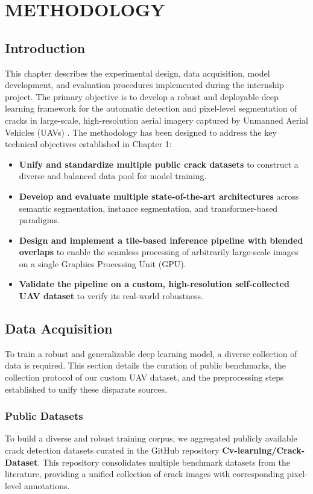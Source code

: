 \chapter{METHODOLOGY}
\label{chap:methodology}

\section{Introduction}
\hs This chapter describes the experimental design, data acquisition, model development, and evaluation procedures implemented during the internship project. The primary objective is to develop a robust and deployable deep learning framework for the automatic detection and pixel-level segmentation of cracks in large-scale, high-resolution aerial imagery captured by Unmanned Aerial Vehicles (UAVs) \cite{01-zhang-2024a, 07-chen-2024}. The methodology has been designed to address the key technical objectives established in Chapter 1:

\begin{itemize}
    \item \textbf{Unify and standardize multiple public crack datasets} to construct a diverse and balanced data pool for model training.
    \item \textbf{Develop and evaluate multiple state-of-the-art architectures} across semantic segmentation, instance segmentation, and transformer-based paradigms.
    \item \textbf{Design and implement a tile-based inference pipeline with blended overlaps} to enable the seamless processing of arbitrarily large-scale images on a single Graphics Processing Unit (GPU).
    \item \textbf{Validate the pipeline on a custom, high-resolution self-collected UAV dataset} to verify its real-world robustness.
\end{itemize}

\section{Data Acquisition}
\label{sec:data_acquisition}
\hs To train a robust and generalizable deep learning model, a diverse collection of data is required. This section details the curation of public benchmarks, the collection protocol of our custom UAV dataset, and the preprocessing steps established to unify these disparate sources.

\subsection{Public Datasets}
\label{subsec:public-datasets}
\hs To build a diverse and robust training corpus, we aggregated publicly available crack detection datasets curated in the GitHub repository \textbf{Cv-learning/Crack-Dataset}. This repository consolidates multiple benchmark datasets from the literature, providing a unified collection of crack images with corresponding pixel-level annotations.

